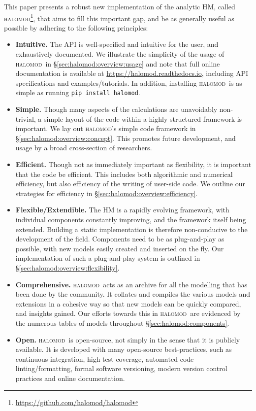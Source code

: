 \documentclass[5p,aas_macros]{elsarticle}
\newcommand{\halomod}{\textsc{halomod}\xspace} %
\providecommand{\DIFaddbegin}{} %
\providecommand{\DIFaddend}{} %
\begin{document}
This paper presents a robust new implementation of the analytic HM, called \halomod\DIFaddbegin \footnote{\url{https://github.com/halomod/halomod}}\DIFaddend ,  that aims to fill this important gap, and be as generally useful as possible by adhering to the following principles:
\begin{itemize}
    \item \textbf{Intuitive.}  The API is well-specified and intuitive for the user, and exhaustively documented. We illustrate the simplicity of the usage of \halomod\ in \S\ref{sec:halomod:overview:usage} and note that full online documentation is available at \url{https://halomod.readthedocs.io}, including API specifications and examples/tutorials. In addition, installing \halomod\ is as simple as running \verb|pip install halomod|.

    \item \textbf{Simple.} Though many aspects of the calculations are unavoidably non-trivial, a simple layout of the code within a highly structured framework is important. We lay out \halomod's simple code framework in \S\ref{sec:halomod:overview:concept}. This promotes future development, and usage by a broad cross-section of researchers. 

    \item \textbf{Efficient. } Though not as immediately important as flexibility, it is important that the code be efficient. This includes both algorithmic and numerical efficiency, but also efficiency of the writing of user-side code.
    We outline our strategies for efficiency in \S\ref{sec:halomod:overview:efficiency}.

    \item \textbf{Flexible/Extendible. } The HM is a rapidly evolving framework, with individual components const\-antly improving, and the framework itself being extended. Building a static implementation is therefore non-conducive  to the development of the field. Components need to be as plug-and-play as possible, with new models easily created and inserted on the fly. Our implementation of 
    such a plug-and-play system is outlined in \S\ref{sec:halomod:overview:flexibility}.

    \item \textbf{Comprehensive. } \halomod\ acts as an archive for all the modelling that has been done by the community. It collates and compiles the various models and extensions in a cohesive way so that new models can be quickly compared, and insights gained. Our efforts towards this in \halomod\ are evidenced by the numerous tables of models throughout \S\ref{sec:halomod:components}.

    \item \textbf{Open. } \halomod\ is open-source, not simply in the sense that it is publicly available. It is developed with many open-source best-practices, such as continuous integration, high test coverage, automated code linting/formatting, formal software versioning, modern version control practices and online documentation. 
\end{itemize}
\end{document}
